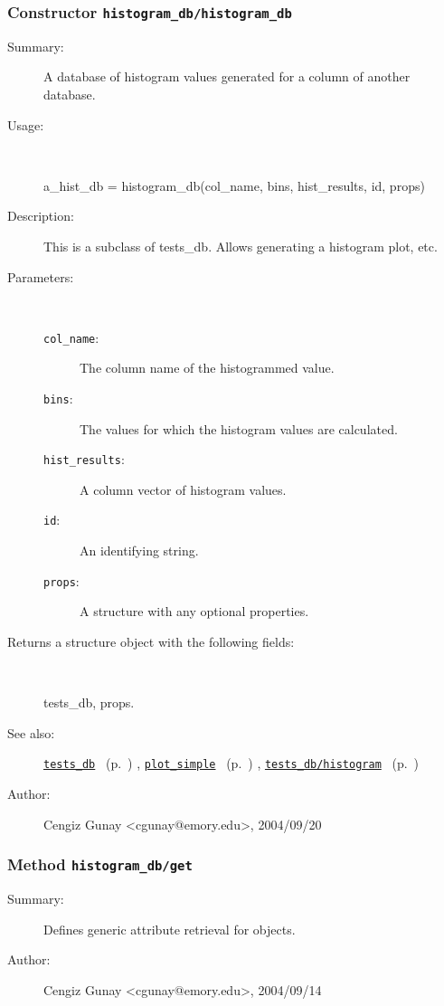 \subsubsection[Constructor \texttt{histogram\_db}]{Constructor \texttt{histogram\_db/histogram\_db}}%
%
\label{ref_histogram_db__histogram_db}%
\hypertarget{ref_histogram_db__histogram_db}{}%
\begin{description}
\item[Summary:]A database of histogram values generated for 
		a column of another database.
%
\item[Usage:]~%
\begin{lyxcode}%
a\_hist\_db = histogram\_db(col\_name, bins, hist\_results, id, props)
%
\end{lyxcode}%
%
\item[Description:]%
This is a subclass of tests\_db. Allows generating a histogram plot, etc.
\item[Parameters:]~
\begin{description}%
\item[\texttt{col\_name}:]
 The column name of the histogrammed value.
\item[\texttt{bins}:]
 The values for which the histogram values are calculated.
\item[\texttt{hist\_results}:]
 A column vector of histogram values.
\item[\texttt{id}:]
 An identifying string.
\item[\texttt{props}:]
 A structure with any optional properties.
\end{description}%
%
\item[Returns a structure object with the following fields:]~

	tests\_db, props.
%
%
\item[See also:]%
\hyperlink{ref_tests_db}{\texttt{tests\_db}}%
\ (p.~\pageref{ref_tests_db})%
%
, \hyperlink{ref_plot_simple}{\texttt{plot\_simple}}%
\ (p.~\pageref{ref_plot_simple})%
%
, \hyperlink{ref_tests_db__histogram}{\texttt{tests\_db/histogram}}%
\ (p.~\pageref{ref_tests_db__histogram})%
%
%
\item[Author:]%
Cengiz Gunay <cgunay@emory.edu>, 2004/09/20%
\end{description}
\methodline%
\subsubsection[Method \texttt{get}]{Method \texttt{histogram\_db/get}}%
%
\label{ref_histogram_db__get}%
\hypertarget{ref_histogram_db__get}{}%
\begin{description}
\item[Summary:]Defines generic attribute retrieval for objects.
%
%
%
%
%
%
%
\item[Author:]%
Cengiz Gunay <cgunay@emory.edu>, 2004/09/14%
\end{description}
\methodline%
